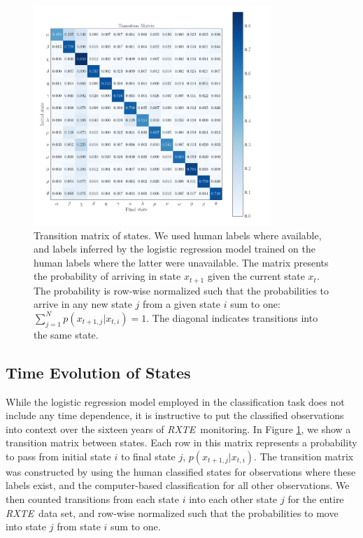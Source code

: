\documentclass[fleqn,usenatbib]{mnras}
\newcommand{\project}[1]{\textsl{#1}}
\newcommand{\rxte}{\project{RXTE}}
\begin{document}
\begin{figure}
\begin{center}
\includegraphics[width=9cm]{grs1915_supervised_transmat.pdf}
\caption{Transition matrix of states. We used human labels where available, and labels inferred by the logistic regression model trained on the human labels where 
the latter were unavailable. The matrix presents the probability of arriving in state $x_{t+1}$ given the current state $x_{t}$. The probability is row-wise normalized 
such that the probabilities to arrive in any new state $j$ from a given state $i$ sum to one: $\sum_{j=1}^{N}p(x_{t+1,j} | x_{t,i}) = 1$. The diagonal indicates transitions into the same state.} 
\label{fig:transitionmatrix}
\end{center}
\end{figure}

\subsection{Time Evolution of States}

While the logistic regression model employed in the classification task does not include any time dependence, it is instructive to put the classified observations 
into context over the sixteen years of \rxte\ monitoring. In Figure \ref{fig:transitionmatrix}, we show a transition matrix between states. Each row in this matrix 
represents a probability to pass from initial state $i$ to final state $j$, $p(x_{t+1, j} | x_{t, i})$. The transition matrix was constructed by using the human 
classified states for observations where these labels exist, and the computer-based classification for all other observations. We then counted transitions from each 
state $i$ into each other state $j$ for the entire \rxte\ data set, and row-wise normalized such that the probabilities to move into state $j$ from state $i$ sum to one.
\end{document}
